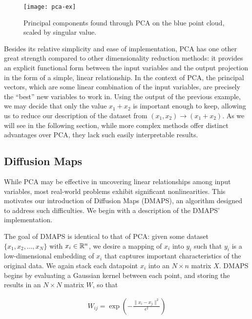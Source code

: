 \begin{figure}
  \centering
  \texttt{[image: pca-ex]}
  \caption[Example of principal component analysis]{Principal
    components found through PCA on the blue point cloud, scaled by
    singular value. \label{fig:pca-ex}}
\end{figure}

Besides its relative simplicity and ease of implementation, PCA has
one other great strength compared to other dimensionality reduction
methods: it provides an explicit functional form between the input
variables and the output projection in the form of a simple, linear
relationship. In the context of PCA, the principal vectors, which are
some linear combination of the input variables, are precisely the
``best'' new variables to work in. Using the output of the previous
example, we may decide that only the value $x_1 + x_2$ is important
enough to keep, allowing us to reduce our description of the dataset
from $(x_1, x_2) \rightarrow (x_1 + x_2)$. As we will see in the
following section, while more complex methods offer distinct
advantages over PCA, they lack such easily interpretable results.

\subsection{Diffusion Maps \label{sec:dmaps}}

While PCA may be effective in uncovering linear relationships among
input variables, most real-world problems exhibit significant
nonlinearities. This motivates our introduction of Diffusion Maps
(DMAPS), an algorithm designed to address such difficulties. We begin
with a description of the DMAPS' implementation.

The goal of DMAPS is identical to that of PCA: given some dataset
$\{x_1, x_2, \hdots, x_N \}$ with $x_i \in \mathbb{R}^n$, we desire a mapping
of $x_i$ into $y_i$ such that $y_i$ is a low-dimensional embedding of
$x_i$ that captures important characteristics of the original data. We
again stack each datapoint $x_i$ into an $N \times n$ matrix
$X$. DMAPS begins by evaluating a Gaussian kernel between each point,
and storing the results in an $N \times N$ matrix $W$, so that

\begin{align}
  W_{ij} = \exp \left( -\frac{\|x_i - x_j\|^2}{\epsilon^2} \right)
\end{align}


